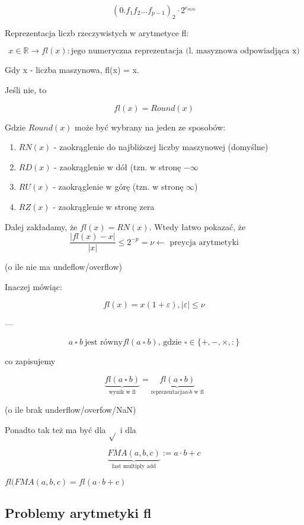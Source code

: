 \documentclass[hidelinks,a4paper,fleqn]{article}
\begin{document}
\[
	(0.f_1f_2...f_{p-1})_2 \cdot 2^{e_{min}}
\]

Reprezentacja liczb rzeczywistych w arytmetyce fl:

\[
	x \in \mathbb{R} \rightarrow fl(x) : \textrm{jego numeryczna reprezentacja (l. masyznowa odpowiadjąca x)}
\]

Gdy x - liczba maszynowa, fl(x) = x.

Jeśli nie, to

\[
	fl(x) = Round(x)
\]

Gdzie $Round(x)$ może być wybrany na jeden ze sposobów:

\begin{enumerate}
	\item $RN(x)$ - zaokrąglenie do najbliższej liczby maszynowej (domyślne)
	\item $RD(x)$ - zaokrąglenie w dół (tzn. w stronę $-\infty$
	\item $RU(x)$ - zaokrąglenie w górę (tzn. w stronę $\infty$)
	\item $RZ(x)$ - zaokrąglenie w stronę zera
\end{enumerate}

Dalej zakładamy, że $fl(x) = RN(x)$. Wtedy łatwo pokazać, że 
\[
	\frac{|fl(x) - x|}{|x|} \leq 2^{-p} = \nu \leftarrow \textrm{ preycja arytmetyki}
\]

(o ile nie ma undeflow/overflow)

Inaczej mówiąc:

\[
	fl(x) = x(1 + \varepsilon), |\varepsilon| \leq \nu
\]

---

\[
	a\ \square\ b\ \textrm{jest równy} fl(a\ \square\ b)\textrm{, gdzie }\square \in \{+, -, \times, :\}
\]

co zapisujemy

\[
	\underbrace{fl(a\ \square\ b)}_{\textrm{wynik w fl}} = \underbrace{fl(a\ \square\ b)}_{\textrm{reprezentacja} a \square b \textrm{ w fl}}
\]

(o ile brak underflow/overfow/NaN)

Ponadto tak też ma być dla $\sqrt{}$ i dla

\[
	\underbrace{FMA(a, b, c)}_{\textrm{fast multiply add}} := a \cdot b + c
\]

$fl(FMA(a, b, c) = fl(a \cdot b + c)$

\subsection{Problemy arytmetyki fl}
\end{document}
